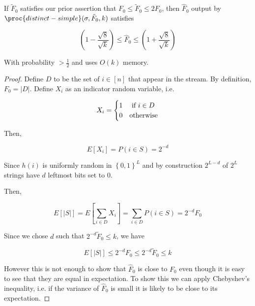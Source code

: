 \documentclass[../notes.tex]{subfiles}
\begin{document}
\begin{theorem}
    If $ \tilde{F}_0  $ satisfies our prior assertion that $ F_0 \le \tilde{F}_0 \le  2 F_0 $, then $ \hat{F}_0 $ output by $ \proc{distinct-simple}(\sigma, \tilde{F}_0, k) $ satisfies 

    \begin{equation}
        (1-\frac{\sqrt{8} }{\sqrt{k} }) \le  \hat{F}_0 \le  (1+\frac{\sqrt{8} }{\sqrt{k} }) 
    \end{equation}

    With probability $ > \frac{1}{2} $ and uses $ O(k) $ memory.


\begin{proof}

    Define $ D $  to be the set of $ i \in [n] $ that appear in the stream. By definition, $ F_0 = |D| $.
    Define $ X_i $ as an indicator random variable, i.e. 

    \begin{equation}
        X_i = \begin{cases}
            1 & \text{ if $ i \in D $} \\
            0 & \text{otherwise}
        \end{cases}
    \end{equation}

    Then,

    \begin{equation}
        E[X_i] = P(i \in S) = 2^{-d}
    \end{equation}

    Since $ h(i) $ is uniformly random in $ \left\{ 0, 1 \right\} ^L $ and by construction $ 2^{L-d}  $ of $ 2^L $ strings have $ d $ leftmost bits set to $ 0 $.

    Then,

    \begin{equation}
        E[|S|] = E[\sum_{i \in D} X_i] = \sum_{i \in D} P(i \in S) = 2^{-d} F_0
    \end{equation}

    Since we chose $ d $ such that $ 2^{-d} \tilde{F}_0 \le  k $, we have

    \begin{equation}
        E[|S|] \le 2^{-d}F_0 \le  2^{-d} \tilde{F}_0 \le k
    \end{equation}


    However this is not enough to show that $ \hat{F}_0 $ is close to $ F_0 $ even though it is easy to see that they are equal in expectation.
    To show this we can apply Chebyshev's inequality, i.e. if the variance of $ \hat{F}_0 $ is small it is likely to be close to its expectation.



\end{proof}
\end{theorem}
\end{document}
